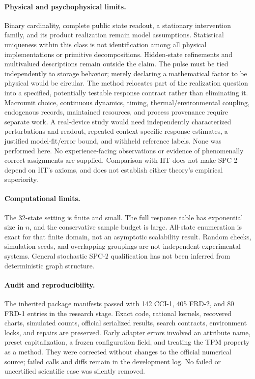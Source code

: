 \documentclass[11pt]{article}
\theoremstyle{definition}\newtheorem{definition}[theorem]{Definition}
\theoremstyle{remark}\newtheorem{remark}[theorem]{Remark}
\begin{document}
\paragraph{Physical and psychophysical limits.}
Binary cardinality, complete public state readout, a stationary intervention family, and its product realization remain model assumptions. Statistical uniqueness within this class is not identification among all physical implementations or primitive decompositions. Hidden-state refinements and multivalued descriptions remain outside the claim. The pulse must be tied independently to storage behavior; merely declaring a mathematical factor to be physical would be circular. The method relocates part of the realization question into a specified, potentially testable response contract rather than eliminating it. Macrounit choice, continuous dynamics, timing, thermal/environmental coupling, endogenous records, maintained resources, and process provenance require separate work. A real-device study would need independently characterized perturbations and readout, repeated context-specific response estimates, a justified model-fit/error bound, and withheld reference labels. None was performed here. No experience-facing observations or evidence of phenomenally correct assignments are supplied. Comparison with IIT does not make SPC-2 depend on IIT's axioms, and does not establish either theory's empirical superiority.

\paragraph{Computational limits.}
The 32-state setting is finite and small. The full response table has exponential size in $n$, and the conservative sample budget is large. All-state enumeration is exact for that finite domain, not an asymptotic scalability result. Random checks, simulation seeds, and overlapping groupings are not independent experimental systems. General stochastic SPC-2 qualification has not been inferred from deterministic graph structure.

\paragraph{Audit and reproducibility.}
The inherited package manifests passed with 142 CCI-1, 405 FRD-2, and 80 FRD-1 entries in the research stage. Exact code, rational kernels, recovered charts, simulated counts, official serialized results, search contracts, environment locks, and repairs are preserved. Early adapter errors involved an attribute name, preset capitalization, a frozen configuration field, and treating the TPM property as a method. They were corrected without changes to the official numerical source; failed calls and diffs remain in the development log. No failed or uncertified scientific case was silently removed.
\end{document}
